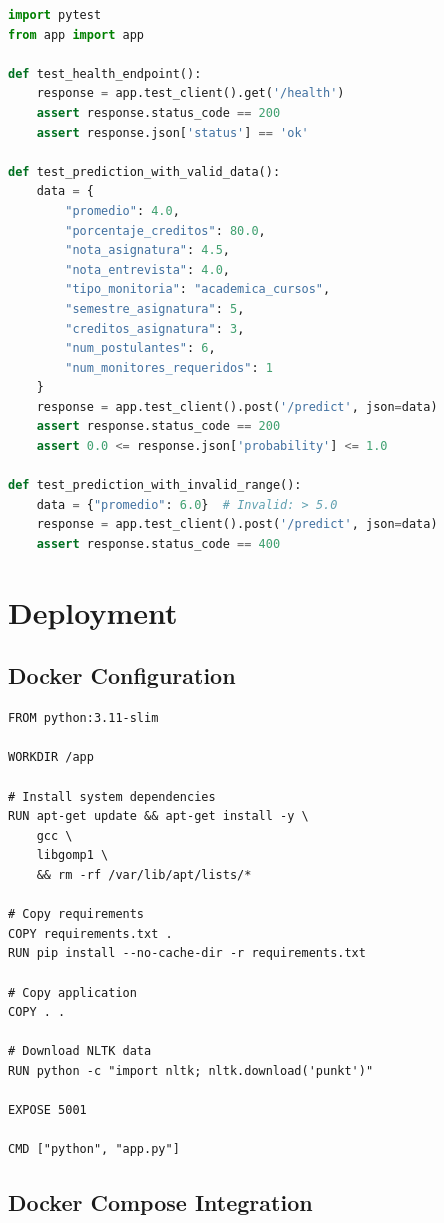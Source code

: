 \documentclass[12pt,a4paper]{report}
\begin{document}
\begin{lstlisting}[language=Python, caption={AI Service Unit Tests}]
import pytest
from app import app

def test_health_endpoint():
    response = app.test_client().get('/health')
    assert response.status_code == 200
    assert response.json['status'] == 'ok'

def test_prediction_with_valid_data():
    data = {
        "promedio": 4.0,
        "porcentaje_creditos": 80.0,
        "nota_asignatura": 4.5,
        "nota_entrevista": 4.0,
        "tipo_monitoria": "academica_cursos",
        "semestre_asignatura": 5,
        "creditos_asignatura": 3,
        "num_postulantes": 6,
        "num_monitores_requeridos": 1
    }
    response = app.test_client().post('/predict', json=data)
    assert response.status_code == 200
    assert 0.0 <= response.json['probability'] <= 1.0

def test_prediction_with_invalid_range():
    data = {"promedio": 6.0}  # Invalid: > 5.0
    response = app.test_client().post('/predict', json=data)
    assert response.status_code == 400
\end{lstlisting}

\chapter{Deployment}

\section{Docker Configuration}

\begin{lstlisting}[caption={Dockerfile for AI Service}]
FROM python:3.11-slim

WORKDIR /app

# Install system dependencies
RUN apt-get update && apt-get install -y \
    gcc \
    libgomp1 \
    && rm -rf /var/lib/apt/lists/*

# Copy requirements
COPY requirements.txt .
RUN pip install --no-cache-dir -r requirements.txt

# Copy application
COPY . .

# Download NLTK data
RUN python -c "import nltk; nltk.download('punkt')"

EXPOSE 5001

CMD ["python", "app.py"]
\end{lstlisting}

\section{Docker Compose Integration}
\end{document}
